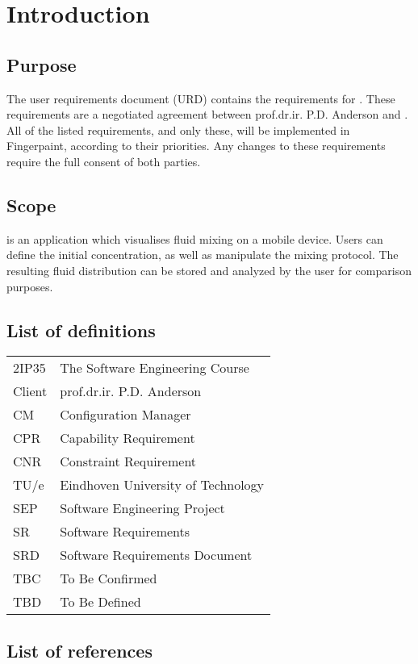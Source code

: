 \chapter{Introduction}

\section{Purpose}
The user requirements document (URD) contains the requirements for \projectname. These requirements are a negotiated agreement between prof.dr.ir. P.D. Anderson and \projectauthor. All of the listed requirements, and only these, will be implemented in Fingerpaint, according to their priorities. Any changes to these requirements require the full consent of both parties.

\section{Scope}
\projectname is an application which visualises fluid mixing on a mobile device. Users can define the initial concentration, as well as manipulate the mixing protocol. The resulting fluid distribution can be stored and analyzed by the user for comparison purposes.

\section{List of definitions}
\begin{tabular}{l|l}
2IP35 & The Software Engineering Course \\
Client & prof.dr.ir. P.D. Anderson \\
CM    &Configuration Manager \\
CPR & Capability Requirement \\
CNR & Constraint Requirement \\
TU/e  &Eindhoven University of Technology \\
SEP   &Software Engineering Project \\
SR    &Software Requirements \\
SRD   &Software Requirements Document \\
TBC & To Be Confirmed \\
TBD & To Be Defined \\
\end{tabular}

\section{List of references}

